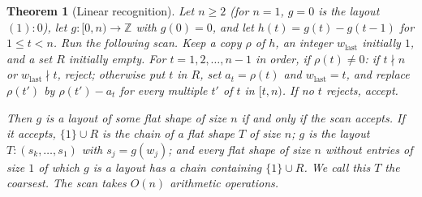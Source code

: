 \documentclass[11pt]{article}
\newtheorem{theorem}{Theorem}
\theoremstyle{definition}
\newcommand{\Z}{\mathbb{Z}}
\begin{document}
\begin{theorem}[Linear recognition]\label{thm:decide}
Let $n \ge 2$ (for $n = 1$, $g = 0$ is the layout $(1){:}0$), let
$g : [0,n) \to \Z$ with $g(0) = 0$, and let $h(t) = g(t) - g(t-1)$ for
$1 \le t < n$. Run the following scan. Keep a copy $\rho$ of $h$, an integer
$w_{\mathrm{last}}$ initially $1$, and a set $R$ initially empty. For
$t = 1, 2, \dots, n-1$ in order, if $\rho(t) \ne 0$: if $t \nmid n$ or
$w_{\mathrm{last}} \nmid t$, reject; otherwise put $t$ in $R$, set
$a_t = \rho(t)$ and $w_{\mathrm{last}} = t$, and replace $\rho(t')$ by
$\rho(t') - a_t$ for every multiple $t'$ of $t$ in $[t, n)$. If no $t$
rejects, accept.

Then $g$ is a layout of some flat shape of size $n$ if and only if the scan
accepts. If it accepts, $\{1\} \cup R$ is the chain of a flat shape $T$ of
size $n$; $g$ is the layout $T{:}(s_k,\dots,s_1)$ with $s_j = g(w_j)$; and
every flat shape of size $n$ without entries of size $1$ of which $g$ is a
layout has a chain containing $\{1\} \cup R$. We call this $T$ the
\emph{coarsest}. The scan takes $O(n)$ arithmetic operations.
\end{theorem}
\end{document}

